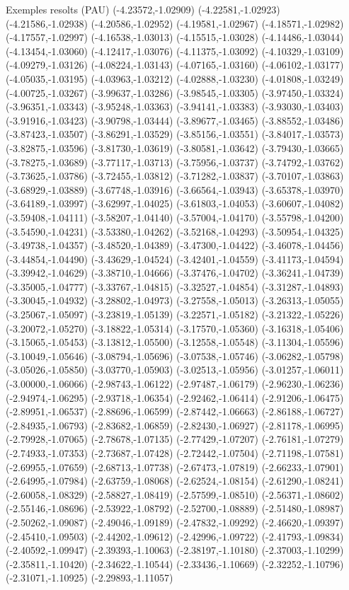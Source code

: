\documentclass[11pt,a4paper]{article}
\begin{document}
\begin{fmex}{Exemples resolts (PAU)}
(-4.23572,-1.02909) (-4.22581,-1.02923) (-4.21586,-1.02938) (-4.20586,-1.02952) (-4.19581,-1.02967) (-4.18571,-1.02982) (-4.17557,-1.02997) (-4.16538,-1.03013) (-4.15515,-1.03028) (-4.14486,-1.03044) (-4.13454,-1.03060) (-4.12417,-1.03076) (-4.11375,-1.03092) (-4.10329,-1.03109) (-4.09279,-1.03126) (-4.08224,-1.03143) (-4.07165,-1.03160) (-4.06102,-1.03177) (-4.05035,-1.03195) (-4.03963,-1.03212) (-4.02888,-1.03230) (-4.01808,-1.03249) (-4.00725,-1.03267) (-3.99637,-1.03286) (-3.98545,-1.03305) (-3.97450,-1.03324) (-3.96351,-1.03343) (-3.95248,-1.03363) (-3.94141,-1.03383) (-3.93030,-1.03403) (-3.91916,-1.03423) (-3.90798,-1.03444) (-3.89677,-1.03465) (-3.88552,-1.03486) (-3.87423,-1.03507) (-3.86291,-1.03529) (-3.85156,-1.03551) (-3.84017,-1.03573) (-3.82875,-1.03596) (-3.81730,-1.03619) (-3.80581,-1.03642) (-3.79430,-1.03665) (-3.78275,-1.03689) (-3.77117,-1.03713) (-3.75956,-1.03737) (-3.74792,-1.03762) (-3.73625,-1.03786) (-3.72455,-1.03812) (-3.71282,-1.03837) (-3.70107,-1.03863) (-3.68929,-1.03889) (-3.67748,-1.03916) (-3.66564,-1.03943) (-3.65378,-1.03970) (-3.64189,-1.03997) (-3.62997,-1.04025) (-3.61803,-1.04053) (-3.60607,-1.04082) (-3.59408,-1.04111) (-3.58207,-1.04140) (-3.57004,-1.04170) (-3.55798,-1.04200) (-3.54590,-1.04231) (-3.53380,-1.04262) (-3.52168,-1.04293) (-3.50954,-1.04325) (-3.49738,-1.04357) (-3.48520,-1.04389) (-3.47300,-1.04422) (-3.46078,-1.04456) (-3.44854,-1.04490) (-3.43629,-1.04524) (-3.42401,-1.04559) (-3.41173,-1.04594) (-3.39942,-1.04629) (-3.38710,-1.04666) (-3.37476,-1.04702) (-3.36241,-1.04739) (-3.35005,-1.04777) (-3.33767,-1.04815) (-3.32527,-1.04854) (-3.31287,-1.04893) (-3.30045,-1.04932) (-3.28802,-1.04973) (-3.27558,-1.05013) (-3.26313,-1.05055) (-3.25067,-1.05097) (-3.23819,-1.05139) (-3.22571,-1.05182) (-3.21322,-1.05226) (-3.20072,-1.05270) (-3.18822,-1.05314) (-3.17570,-1.05360) (-3.16318,-1.05406) (-3.15065,-1.05453) (-3.13812,-1.05500) (-3.12558,-1.05548) (-3.11304,-1.05596) (-3.10049,-1.05646) (-3.08794,-1.05696) (-3.07538,-1.05746) (-3.06282,-1.05798) (-3.05026,-1.05850) (-3.03770,-1.05903) (-3.02513,-1.05956) (-3.01257,-1.06011) (-3.00000,-1.06066) (-2.98743,-1.06122) (-2.97487,-1.06179) (-2.96230,-1.06236) (-2.94974,-1.06295) (-2.93718,-1.06354) (-2.92462,-1.06414) (-2.91206,-1.06475) (-2.89951,-1.06537) (-2.88696,-1.06599) (-2.87442,-1.06663) (-2.86188,-1.06727) (-2.84935,-1.06793) (-2.83682,-1.06859) (-2.82430,-1.06927) (-2.81178,-1.06995) (-2.79928,-1.07065) (-2.78678,-1.07135) (-2.77429,-1.07207) (-2.76181,-1.07279) (-2.74933,-1.07353) (-2.73687,-1.07428) (-2.72442,-1.07504) (-2.71198,-1.07581) (-2.69955,-1.07659) (-2.68713,-1.07738) (-2.67473,-1.07819) (-2.66233,-1.07901) (-2.64995,-1.07984) (-2.63759,-1.08068) (-2.62524,-1.08154) (-2.61290,-1.08241) (-2.60058,-1.08329) (-2.58827,-1.08419) (-2.57599,-1.08510) (-2.56371,-1.08602) (-2.55146,-1.08696) (-2.53922,-1.08792) (-2.52700,-1.08889) (-2.51480,-1.08987) (-2.50262,-1.09087) (-2.49046,-1.09189) (-2.47832,-1.09292) (-2.46620,-1.09397) (-2.45410,-1.09503) (-2.44202,-1.09612) (-2.42996,-1.09722) (-2.41793,-1.09834) (-2.40592,-1.09947) (-2.39393,-1.10063) (-2.38197,-1.10180) (-2.37003,-1.10299) (-2.35811,-1.10420) (-2.34622,-1.10544) (-2.33436,-1.10669) (-2.32252,-1.10796) (-2.31071,-1.10925) (-2.29893,-1.11057) 
\end{fmex}
\end{document}
